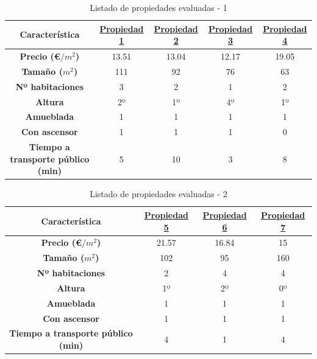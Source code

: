 \documentclass[12pt]{report} %
\begin{document}
    \begin{table}[H]
        \center
        \begin{tabular}{|c|cccc|}
            \hline
            \textbf{Característica} & \href{https://www.idealista.com/inmueble/106565852/}{Propiedad 1} & \href{https://www.idealista.com/inmueble/97146418/}{Propiedad 2} & \href{https://www.idealista.com/inmueble/104278344/}{Propiedad 3} & \href{https://www.idealista.com/inmueble/106562120/}{Propiedad 4} \\
            \hline
            \hline
            \textbf{Precio (€$/m^2$)}                  & 13.51 & 13.04 & 12.17 & 19.05 \\
            \textbf{Tamaño ($m^2$)}                    & 111   & 92    & 76    & 63    \\
            \textbf{Nº habitaciones}                   & 3     & 2     & 1     & 2     \\
            \textbf{Altura}                            & 2º    & 1º    & 4º    & 1º    \\
            \textbf{Amueblada}                         & 1     & 1     & 1     & 1     \\
            \textbf{Con ascensor}                      & 1     & 1     & 1     & 0     \\
            \textbf{Tiempo a transporte público (min)} & 5     & 10    & 3     & 8     \\
            \hline
        \end{tabular}
        \caption{Listado de propiedades evaluadas - 1}
    \end{table}
    \begin{table}[H]
        \center
        \begin{tabular}{|c|ccc|}
            \hline
            \textbf{Característica} & \href{https://www.idealista.com/inmueble/106559777/}{Propiedad 5} & \href{https://www.idealista.com/inmueble/106224752/}{Propiedad 6} & \href{https://www.idealista.com/inmueble/106137531/}{Propiedad 7} \\
            \hline
            \hline
            \textbf{Precio (€$/m^2$)}                  & 21.57 & 16.84 & 15  \\
            \textbf{Tamaño ($m^2$)}                    & 102   & 95    & 160 \\
            \textbf{Nº habitaciones}                   & 2     & 4     & 4   \\
            \textbf{Altura}                            & 1º    & 2º    & 0º  \\
            \textbf{Amueblada}                         & 1     & 1     & 1   \\
            \textbf{Con ascensor}                      & 1     & 1     & 1   \\
            \textbf{Tiempo a transporte público (min)} & 4     & 1     & 4   \\
            \hline
        \end{tabular}
        \caption{Listado de propiedades evaluadas - 2}
    \end{table}
\end{document}

